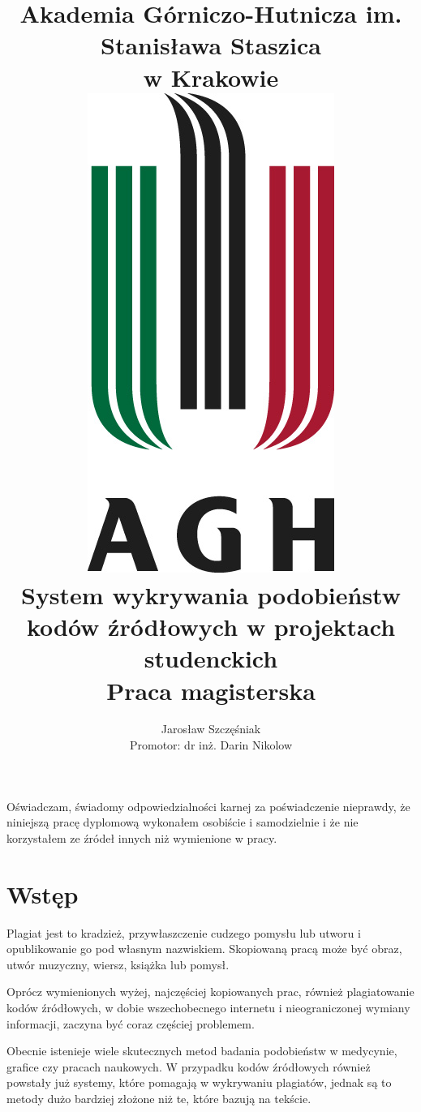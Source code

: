 \documentclass[a4paper,12pt,twoside]{article}
\title
{
	\Large
	Akademia Górniczo-Hutnicza im. Stanisława Staszica \\ w Krakowie \\
	\vspace{10 mm}
	\includegraphics[scale=0.8]{gfx/agh.jpg} \\
	\textbf{ System wykrywania podobieństw kodów źródłowych w projektach studenckich } \\
	Praca magisterska \\
	\vspace{10 mm}
}
\author
{
	\vspace{10 mm}
	Jarosław Szczęśniak \\
	Promotor: dr inż. Darin Nikolow
	\vspace{10 mm}
}
\begin{document}

\lstset{escapechar=@,style=customjava}

\renewcommand{\labelitemi}{$\bullet$}
\renewcommand{\labelitemii}{$\circ$}
\renewcommand{\labelitemiii}{\tiny$\blacksquare$}
\renewcommand{\labelitemiv}{$\diamond$}

\maketitle\thispagestyle{empty}

\newpage\thispagestyle{empty}
\mbox{}

\newpage\thispagestyle{empty}

\vspace*{\fill}
Oświadczam, świadomy odpowiedzialności karnej za poświadczenie nieprawdy, że niniejszą pracę dyplomową wykonałem osobiście i samodzielnie i że nie korzystałem ze źródeł innych niż wymienione w pracy.
\vspace*{\fill}

\newpage\thispagestyle{empty}
\mbox{}

\newpage\thispagestyle{empty}

\tableofcontents\thispagestyle{empty}
 
\newpage

\section{Wstęp}

Plagiat jest to kradzież, przywłaszczenie cudzego pomysłu lub utworu i opublikowanie go pod własnym nazwiskiem. Skopiowaną pracą może być obraz, utwór muzyczny, wiersz, książka lub pomysł\cite{plagiat}.

Oprócz wymienionych wyżej, najczęściej kopiowanych prac, również plagiatowanie kodów źródłowych, w dobie wszechobecnego internetu i nieograniczonej wymiany informacji, zaczyna być coraz częściej problemem.

Obecnie istenieje wiele skutecznych metod badania podobieństw w medycynie, grafice czy pracach naukowych. W przypadku kodów źródłowych również powstały już systemy, które pomagają w wykrywaniu plagiatów, jednak są to metody dużo bardziej złożone niż te, które bazują na tekście.
\end{document}
